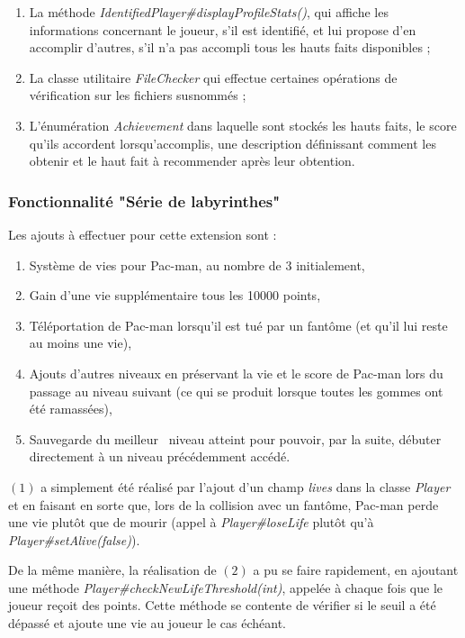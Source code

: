 \documentclass[12pt, openany]{report}
\begin{document}
\begin{enumerate}
\item La méthode \mbox{\textit{IdentifiedPlayer\#displayProfileStats()}}, qui affiche les informations concernant le joueur, s'il est identifié, et lui propose d'en accomplir d'autres, s'il n'a pas accompli tous les hauts faits disponibles ;
\item La classe utilitaire \mbox{\textit{FileChecker}} qui effectue certaines opérations de vérification sur les fichiers susnommés ;
\item L'énumération \mbox{\textit{Achievement}} dans laquelle sont stockés les hauts faits, le score qu'ils accordent lorsqu'accomplis, une description définissant comment les obtenir et le haut fait à recommender après leur obtention.
\end{enumerate}


\subsubsection{Fonctionnalité "Série de labyrinthes"}
Les ajouts à effectuer pour cette extension sont :
\begin{enumerate}
	\item Système de vies pour Pac-man, au nombre de 3 initialement,
	\item Gain d'une vie supplémentaire tous les 10000 points,
	\item Téléportation de Pac-man lorsqu'il est tué par un fantôme (et qu'il lui reste au moins une vie),
	\item Ajouts d'autres niveaux en préservant la vie et le score de Pac-man lors du passage au niveau suivant (ce qui se produit lorsque toutes les gommes ont été ramassées),
	\item Sauvegarde du \og meilleur \fg \, niveau atteint pour pouvoir, par la suite, débuter directement à un niveau précédemment accédé.
\end{enumerate} 

$(1)$ a simplement été réalisé par l'ajout d'un champ \mbox{\textit{lives}} dans la classe \mbox{\textit{Player}} et en faisant en sorte que, lors de la collision avec un fantôme, Pac-man perde une vie plutôt que de mourir (appel à \mbox{\textit{Player\#loseLife}} plutôt qu'à \mbox{\textit{Player\#setAlive(false)}}).

De la même manière, la réalisation de $(2)$ a pu se faire rapidement, en ajoutant une méthode \mbox{\textit{Player\#checkNewLifeThreshold(int)}}, appelée à chaque fois que le joueur reçoit des points. Cette méthode se contente de vérifier si le seuil a été dépassé et ajoute une vie au joueur le cas échéant.
\end{document}
